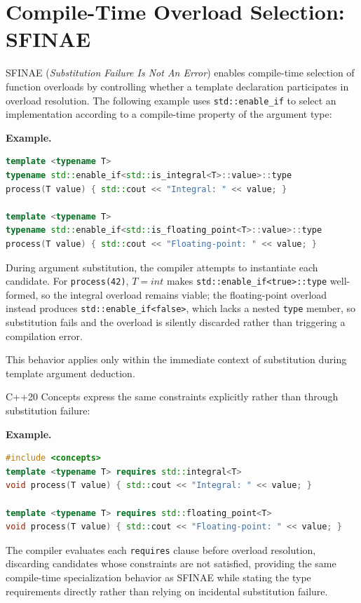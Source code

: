 \documentclass[11pt]{report}
\begin{document}

\section{Compile-Time Overload Selection: SFINAE}
\label{Metaprogramming:Compile-TimeOverloadSelection}

SFINAE (\emph{Substitution Failure Is Not An Error}) enables compile-time
selection of function overloads by controlling whether a template
declaration participates in overload resolution. The following example uses
\texttt{std::enable\_if} to select an implementation according to a
compile-time property of the argument type:

\begin{examplebox}
\textbf{Example.}

\begin{lstlisting}[language=C++]
template <typename T>
typename std::enable_if<std::is_integral<T>::value>::type
process(T value) { std::cout << "Integral: " << value; }

template <typename T>
typename std::enable_if<std::is_floating_point<T>::value>::type
process(T value) { std::cout << "Floating-point: " << value; }
\end{lstlisting}
During argument substitution, the compiler attempts to instantiate each
candidate. For \texttt{process(42)}, $T = int$ makes
\texttt{std::enable\_if<true>::type} well-formed, so the integral overload
remains viable; the floating-point overload instead produces
\texttt{std::enable\_if<false>}, which lacks a nested \texttt{type} member,
so substitution fails and the overload is silently discarded rather than
triggering a compilation error.
\end{examplebox}

This behavior applies only within the
immediate context of substitution during template argument deduction.

C++20 Concepts express the same constraints explicitly rather than through
substitution failure:

\begin{examplebox}
\textbf{Example.}

\begin{lstlisting}[language=C++]
#include <concepts>
template <typename T> requires std::integral<T>
void process(T value) { std::cout << "Integral: " << value; }

template <typename T> requires std::floating_point<T>
void process(T value) { std::cout << "Floating-point: " << value; }
\end{lstlisting}
The compiler evaluates each \texttt{requires} clause before overload
resolution, discarding candidates whose constraints are not satisfied,
providing the same compile-time specialization behavior as SFINAE while
stating the type requirements directly rather than relying on incidental
substitution failure.
\end{examplebox}
\end{document}
